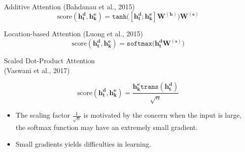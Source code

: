 \begin{frame}{Additive Attention \large{(Bahdanau et al., 2015)}}
\centering
    \begin{equation*}
        \text{score}(\bm{h^d_{t}}, \bm{h^e_{k}}) = \texttt{tanh}\big( [\bm{h^d_t}; \bm{h^e_k} ] \bm{W^{(h)}}\big) \bm{W^{(s)}}
    \end{equation*}
\end{frame}


\begin{frame}{Location-based Attention \large{(Luong et al., 2015)}}
\centering
    \begin{equation*}
        \text{score}(\bm{h^d_{t}}, \bm{h^e_{k}}) = \texttt{softmax}\big( 
        \bm{h^d_t} \bm{W^{(s)}}
        \big)
    \end{equation*}
\end{frame}

\begin{frame}{Scaled Dot-Product Attention \\\large{(Vaswani et al., 2017)}}
\begin{center}
    \begin{equation*}
        \text{score}(\bm{h^d_{t}}, \bm{h^e_{k}}) = \frac{\bm{h^e_{k}}\texttt{trans}(\bm{h^d_t})}{\sqrt{n}}
    \end{equation*}
\end{center}

\begin{itemize}
    \item The scaling factor $\frac{1}{\sqrt{n}}$ is motivated by the concern when the input is large, the softmax function may have an extremely small gradient.
    \item Small gradients yields difficulties in learning.
\end{itemize}
\end{frame}


